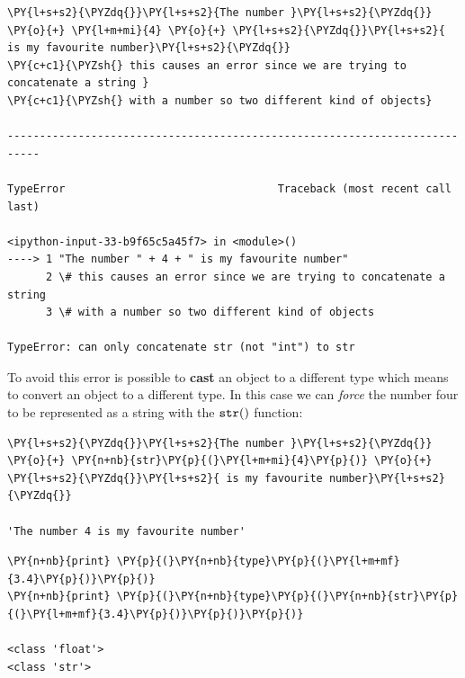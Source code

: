 \begin{tcolorbox}[breakable, size=fbox, boxrule=1pt, pad at break*=1mm, colback=cellbackground, colframe=cellborder]            
\begin{Verbatim}[commandchars=\\\{\}]
\PY{l+s+s2}{\PYZdq{}}\PY{l+s+s2}{The number }\PY{l+s+s2}{\PYZdq{}} \PY{o}{+} \PY{l+m+mi}{4} \PY{o}{+} \PY{l+s+s2}{\PYZdq{}}\PY{l+s+s2}{ is my favourite number}\PY{l+s+s2}{\PYZdq{}}
\PY{c+c1}{\PYZsh{} this causes an error since we are trying to concatenate a string }
\PY{c+c1}{\PYZsh{} with a number so two different kind of objects}

---------------------------------------------------------------------------

TypeError                                 Traceback (most recent call last)

<ipython-input-33-b9f65c5a45f7> in <module>()
----> 1 "The number " + 4 + " is my favourite number"
      2 \# this causes an error since we are trying to concatenate a string
      3 \# with a number so two different kind of objects

TypeError: can only concatenate str (not "int") to str
\end{Verbatim}
\end{tcolorbox}

To avoid this error is possible to \textbf{cast} an object to a different type which means to convert an object to a different type. In this case we can \emph{force} the number four to be represented as a string with the \(\tt{str()}\) function:

\begin{tcolorbox}[breakable, size=fbox, boxrule=1pt, pad at break*=1mm, colback=cellbackground, colframe=cellborder]            
\begin{Verbatim}[commandchars=\\\{\}]
\PY{l+s+s2}{\PYZdq{}}\PY{l+s+s2}{The number }\PY{l+s+s2}{\PYZdq{}} \PY{o}{+} \PY{n+nb}{str}\PY{p}{(}\PY{l+m+mi}{4}\PY{p}{)} \PY{o}{+} \PY{l+s+s2}{\PYZdq{}}\PY{l+s+s2}{ is my favourite number}\PY{l+s+s2}{\PYZdq{}}

'The number 4 is my favourite number'
\end{Verbatim}
\end{tcolorbox}

\begin{tcolorbox}[breakable, size=fbox, boxrule=1pt, pad at break*=1mm, colback=cellbackground, colframe=cellborder]            
\begin{Verbatim}[commandchars=\\\{\}]
\PY{n+nb}{print} \PY{p}{(}\PY{n+nb}{type}\PY{p}{(}\PY{l+m+mf}{3.4}\PY{p}{)}\PY{p}{)}
\PY{n+nb}{print} \PY{p}{(}\PY{n+nb}{type}\PY{p}{(}\PY{n+nb}{str}\PY{p}{(}\PY{l+m+mf}{3.4}\PY{p}{)}\PY{p}{)}\PY{p}{)}

<class 'float'>
<class 'str'>
\end{Verbatim}
\end{tcolorbox}

